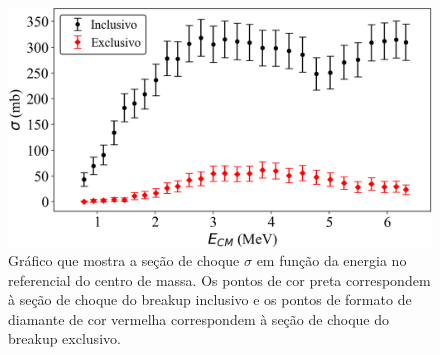 \documentclass[a4paper,12pt,oneside]{book}
\begin{document}
\begin{figure}[H]
\centering
    \includegraphics[scale = 1., width=0.7\columnwidth]{figs/contagens_energia.png}
    \caption{Gráfico que mostra a seção de choque $\sigma$ em função da energia no referencial do centro de massa. Os pontos de cor preta correspondem à seção de choque do breakup inclusivo e os pontos de formato de diamante de cor vermelha correspondem à seção de choque do breakup exclusivo.}
    \label{fig:contagem_energia}
\end{figure}
\end{document}
